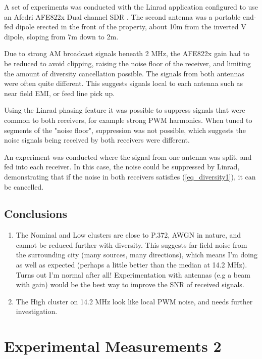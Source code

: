 \documentclass{article}
\begin{document}
A set of experiments was conducted with the Linrad application \cite{linrad_home} configured to use an Afedri AFE822x Dual channel SDR \cite{afedri_dual}.  The second antenna was a portable end-fed dipole erected in the front of the property, about 10m from the inverted V dipole, sloping from 7m down to 2m.

Due to strong AM broadcast signals beneath 2 MHz, the AFE822x gain had to be reduced to avoid clipping, raising the noise floor of the receiver, and limiting the amount of diversity cancellation possible. The signals from both antennas were often quite different.  This suggests signals local to each antenna such as near field EMI, or feed line pick up.

Using the Linrad phasing feature \cite{linrad_phasing} it was possible to suppress signals that were common to both receivers, for example strong PWM harmonics.  When tuned to segments of the "noise floor", suppression was not possible, which suggests the noise signals being received by both receivers were different.

An experiment was conducted where the signal from one antenna was split, and fed into each receiver.  In this case, the noise could be suppressed by Linrad, demonstrating that if the noise in both receivers satisfies (\ref{eq_diversity1}), it can be cancelled.

\subsection{Conclusions}

\begin{enumerate}
\item The Nominal and Low clusters are close to P.372, AWGN in nature, and cannot be reduced further with diversity.  This suggests far field noise from the surrounding city (many sources, many directions), which means I'm doing as well as expected (perhaps a little better than the median at 14.2 MHz).  Turns out I'm normal after all!  Experimentation with antennas (e.g a beam with gain) would be the best way to improve the SNR of received signals. 
\item The High cluster on 14.2 MHz look like local PWM noise, and needs further investigation.
\end{enumerate}

\section{Experimental Measurements 2}





\end{document}
